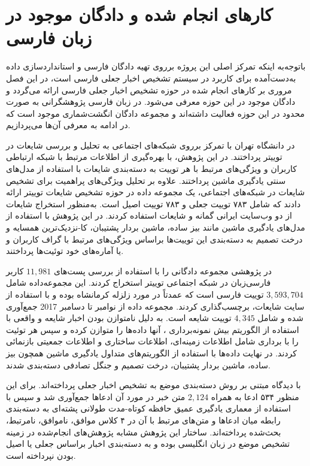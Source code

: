 \section{کارهای انجام شده و دادگان موجود در زبان فارسی}
باتوجه‌به اینکه تمرکز اصلی این پروژه برروی تهیه دادگان فارسی و استانداردسازی داده به‌دست‌آمده برای کاربرد در سیستم تشخیص اخبار جعلی فارسی است، در این فصل مروری بر کارهای انجام شده در حوزه تشخیص اخبار جعلی فارسی ارائه می‌گردد و دادگان موجود در این حوزه معرفی می‌شود. در زبان فارسی پژوهشگرانی به صورت محدود در این حوزه فعالیت داشته‌اند و مجموعه دادگان انگشت‌شماری موجود است که در ادامه به معرفی آن‌ها می‌پردازیم.


\citet{zamani2017rumor} در دانشگاه تهران  با تمرکز برروی شبکه‌های اجتماعی به تحلیل و بررسی شایعات در توییتر پرداختند. در این پژوهش، با بهره‌گیری از اطلاعات مرتبط با شبکه ارتباطی کاربران و ویژگی‌های مرتبط با هر توییت به دسته‌بندی شایعات با استفاده از مدل‌های سنتی یادگیری ماشین پرداختند. علاوه بر تحلیل ویژگی‌های پراهمیت برای تشخیص شایعات در شبکه‌های اجتماعی، یک مجموعه داده در حوزه تشخیص شایعات توییتر ارائه دادند که شامل ۷۸۳ توییت جعلی و ۷۸۳ توییت اصیل است. به‌منظور استخراج شایعات از دو وب‌سایت ایرانی گمانه و شایعات استفاده کردند.
در این پژوهش با استفاده از مدل‌های یادگیری ماشین مانند بیز ساده، ماشین بردار پشتیبان، کا-نزدیک‌ترین همسایه و درخت تصمیم به دسته‌بندی این توییت‌ها براساس ویژگی‌های مرتبط با گراف کاربران و یا آماره‌های خود توئیت‌ها پرداختند.

\citet{mahmoodabad2018persian} در پژوهشی مجموعه دادگانی را با استفاده از بررسی پست‌های $11,981$ کاربر فارسی‌‌زبان در شبکه اجتماعی توییتر استخراج کردند.  این مجموعه‌داده شامل $3,593,704$ توییت فارسی است که عمدتاً در  مورد زلزله کرمانشاه بوده و با استفاده از سایت شایعات، برچسب‌گذاری کردند. مجموعه داده از نوامبر تا دسامبر 2017 جمع‌آوری شده و شامل $4,345$ توییت‌ شایعه است.
%
به دلیل نامتوازن ‌بودن اخبار شایعه و واقعی با استفاده از الگوریتم بیش نمونه‌برداری ، آنها داده‌ها را متوازن کرده و سپس هر توئیت را با برداری شامل اطلاعات زمینه‌ای، اطلاعات ساختاری و اطلاعات جمعیتی بازنمائی کردند. در نهایت داده‌ها با استفاده از الگوریتم‌های متداول یادگیری ماشین همچون بیز ساده، ماشین بردار پشتیبان، درخت تصمیم و جنگل تصادفی دسته‌بندی شدند.

\cite{zarharan2019persian}
با دیدگاه مبتنی بر روش دسته‌بندی موضع به تشخیص اخبار جعلی پرداخته‌اند.  
برای این منظور  ۵۳۴ ادعا به همراه  $2,124$ متن خبر در مورد آن ادعاها جمع‌آوری شد و سپس با استفاده از معماری یادگیری عمیق  حافظه کوتاه-مدت طولانی پشته‌ای به دسته‌بندی رابطه میان ادعاها و متن‌های مرتبط با آن در ۴ کلاس موافق، ناموافق، نامرتبط، بحث‌شده پرداخته‌اند. ساختار این پژوهش مشابه پژوهش‌های انجام‌شده در زمینه تشخیص موضع در زبان انگلیسی بوده  و به دسته‌بندی اخبار براساس جعلی یا اصیل بودن نپرداخته ‌است.



